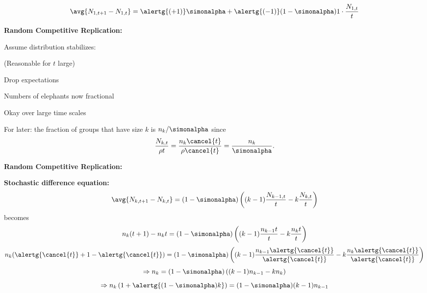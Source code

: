   \bigskip

  
   {
    $$
    \avg{N_{1,t+1} - N_{1,t}}
    =
    \alertg{(+1)}
    \simonalpha
    +
    \alertg{(-1)}
    (1-\simonalpha)
    1\cdot\frac{N_{1,t}}{t}
    $$
  }
  


  \textbf{Random Competitive Replication:}

  
  {
    Assume distribution stabilizes: 
  }

  \smallskip
  
  {
    (Reasonable for $t$ large)
  }
  

  \bigskip

  
    
     
      Drop expectations
     
      Numbers of elephants now fractional
     
      Okay over large time scales 
    
  

  
    
     
      For later:  the fraction of groups that have
      size $k$ is $n_k/\simonalpha$ since
      $$
      \frac{N_{k,t}}{\rho t} 
      = 
      \frac{n_{k} \cancel{t}}{\rho \cancel{t}}
      =
      \frac{n_{k}}{\simonalpha}.
      $$
    
  


  \textbf{Random Competitive Replication:}

  \textbf{Stochastic difference equation:}
    {
      $$
      \avg{N_{k,t+1} - N_{k,t}}
      =
      (1-\simonalpha)
      \left(
        (k-1)\frac{N_{k-1,t}}{t}
        -
        k\frac{N_{k,t}}{t}
      \right)
      $$
    }
    becomes
    {
      $$
      n_k(t+1)-n_k t
      =
      (1-\simonalpha)
      \left(
        (k-1)\frac{n_{k-1}t}{t}
        -
        k\frac{n_{k}t}{t}
      \right)
      $$}
    {
      $$
      n_k(\alertg{\cancel{t}}+1-\alertg{\cancel{t}})
      =
      (1-\simonalpha)
      \left(
        (k-1)\frac{n_{k-1}\alertg{\cancel{t}}}{\alertg{\cancel{t}}}
        -
        k\frac{n_{k}\alertg{\cancel{t}}}{\alertg{\cancel{t}}}
      \right)
      $$}
    {
      $$
      \Rightarrow
      n_k
      =
      (1-\simonalpha)
      \left(
        (k-1)n_{k-1}
        -
        kn_{k}
      \right)
      $$
    }
    {
      $$
      \Rightarrow
      n_k\left( 1 + \alertg{(1-\simonalpha)k} \right)
      =
      (1-\simonalpha)
      (k-1)
      n_{k-1}
      $$
    }
  



